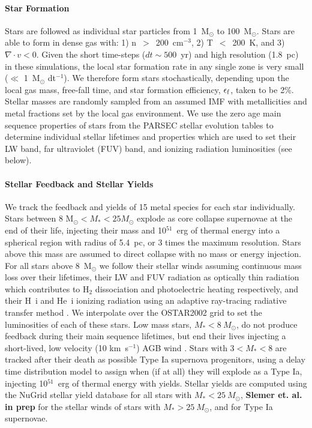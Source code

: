 \documentclass[twocolumn]{aastex61}
\begin{document}
\paragraph{Star Formation} Stars are followed as individual star particles from 1~M$_{\odot}$ to 100~M$_{\odot}$. Stars are able to form in dense gas with: 1) n~$>$~200~cm$^{-3}$, 2) T~$<$~200~K, and 3) $\nabla \cdot v < 0$. Given the short time-steps ($dt \sim 500$~yr) and high resolution (1.8~pc) in these simulations, the local star formation rate in any single zone is very small ($\ll$ 1~M$_{\odot}$ dt$^{-1}$). We therefore form stars stochastically, depending upon the local gas mass, free-fall time, and star formation efficiency, $\epsilon_{\rm f}$, taken to be 2\%. Stellar masses are randomly sampled from an assumed \cite{Salpeter1955} IMF with metallicities and metal fractions set by the local gas environment. We use the zero age main sequence properties of stars from the \textsc{PARSEC} stellar evolution tables \citep{Bressan2012,Tang2014} to determine individual stellar lifetimes and properties which are used to set their LW band, far ultraviolet (FUV) band, and ionizing radiation luminosities (see below).

\paragraph{Stellar Feedback and Stellar Yields} We track the feedback and yields of 15 metal species for each star individually. Stars between 8 M$_{\odot} < M_{*} < 25 M_{\odot}$ explode as core collapse supernovae at the end of their life, injecting their mass and 10$^{51}$~erg of thermal energy into a spherical region with radius of 5.4~pc, or 3 times the maximum resolution. Stars above this mass are assumed to direct collapse with no mass or energy injection. For all stars above 8~M$_{\odot}$ we follow their stellar winds assuming continuous mass loss over their lifetimes, their LW and FUV radiation as optically thin radiation which contributes to H$_2$ dissociation and photoelectric heating respectively, and their H~{\sc i} and He~{\sc i} ionizing radiation using an adaptive ray-tracing radiative transfer method \citep{WiseAbel2011}. We interpolate over the OSTAR2002 \citep{Lanz2003} grid to set the luminosities of each of these stars. Low mass stars, $M_{*} < 8~M_{\odot}$, do not produce feedback during their main sequence lifetimes, but end their lives injecting a short-lived, low velocity (10 km~s$^{-1}$) AGB wind \citep{Goldman2017}. Stars with $3 < M_{*} < 8$ are tracked after their death as possible Type Ia supernova progenitors, using a delay time distribution model to assign when (if at all) they will explode as a Type Ia, injecting 10$^{51}$~erg of thermal energy with yields. Stellar yields are computed using the NuGrid stellar yield database \citep{Ritter2017} for all stars with $M_{*} < 25~M_{\odot}$, \textbf{Slemer et. al. in prep} for the stellar winds of stars with $M_{*} > 25~M_{\odot}$, and \cite{Thielemann1986} for Type Ia supernovae.
\end{document}
